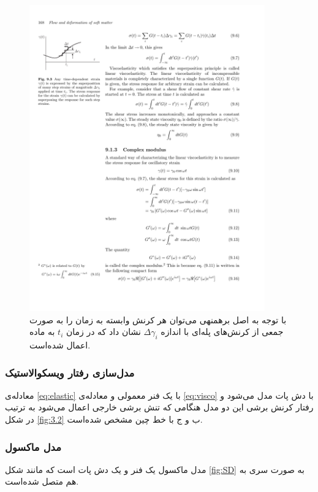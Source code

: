 \begin{figure}[htbp]
\begin{center}
\includegraphics[width=4in]{Figs/9_3}
\caption{
با توجه به اصل برهمنهی می‌توان هر کرنش وابسته به زمان را به صورت جمعی از کرنش‌های پله‌ای با اندازه $\Delta\gamma_i$  نشان داد که در زمان $t_i$ به ماده اعمال شده‌است.
}
\label{fig:super}
\end{center}
\end{figure}


\subsubsection{مدل‌سازی رفتار ویسکوالاستیک}

معادله‌ی \ref{eq:elastic} با یک فنر معمولی و معادله‌ی \ref{eq:visco} با دش پات مدل می‌شود و رفتار کرنش برشی این دو مدل هنگامی که تنش برشی خارجی اعمال می‌شود به ترتیب در شکل \ref{fig:3.2} ب و ج با خط چین مشخص شده‌است.
\subsubsection{مدل ماکسول}
مدل ماکسول یک فنر و یک دش پات است که مانند شکل \ref{fig:SD} به صورت سری به هم متصل شده‌است.

